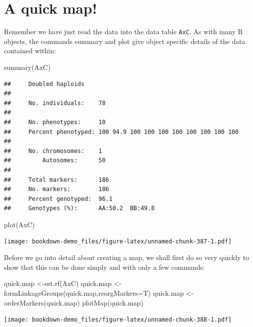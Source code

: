 \documentclass[
]{book}
\newenvironment{Shaded}{\begin{snugshade}}{\end{snugshade}}
\newcommand{\AttributeTok}[1]{\textcolor[rgb]{0.77,0.63,0.00}{#1}}
\newcommand{\FunctionTok}[1]{\textcolor[rgb]{0.00,0.00,0.00}{#1}}
\newcommand{\NormalTok}[1]{#1}
\newcommand{\OtherTok}[1]{\textcolor[rgb]{0.56,0.35,0.01}{#1}}
\begin{document}
\hypertarget{a-quick-map}{%
\section{A quick map!}\label{a-quick-map}}

Remember we have just read the data into the data table \texttt{AxC}. As with many R objects, the commands summary and plot give object specific details of the data contained within:

\begin{Shaded}
\begin{Highlighting}[]
\FunctionTok{summary}\NormalTok{(AxC) }
\end{Highlighting}
\end{Shaded}

\begin{verbatim}
##     Doubled haploids
## 
##     No. individuals:    78 
## 
##     No. phenotypes:     10 
##     Percent phenotyped: 100 94.9 100 100 100 100 100 100 100 100 
## 
##     No. chromosomes:    1 
##         Autosomes:      50 
## 
##     Total markers:      186 
##     No. markers:        186 
##     Percent genotyped:  96.1 
##     Genotypes (%):      AA:50.2  BB:49.8
\end{verbatim}

\begin{Shaded}
\begin{Highlighting}[]
\FunctionTok{plot}\NormalTok{(AxC)}
\end{Highlighting}
\end{Shaded}

\texttt{[image: bookdown-demo\_files/figure-latex/unnamed-chunk-387-1.pdf]}

Before we go into detail about creating a map, we shall first do so very quickly to show that this can be done simply and with only a few commands:

\begin{Shaded}
\begin{Highlighting}[]
\NormalTok{quick.map }\OtherTok{\textless{}{-}}\FunctionTok{est.rf}\NormalTok{(AxC) }
\NormalTok{quick.map }\OtherTok{\textless{}{-}}\FunctionTok{formLinkageGroups}\NormalTok{(quick.map,}\AttributeTok{reorgMarkers=}\NormalTok{T) }
\NormalTok{quick.map }\OtherTok{\textless{}{-}}\FunctionTok{orderMarkers}\NormalTok{(quick.map)}
\FunctionTok{plotMap}\NormalTok{(quick.map)  }
\end{Highlighting}
\end{Shaded}

\texttt{[image: bookdown-demo\_files/figure-latex/unnamed-chunk-388-1.pdf]}
\end{document}
